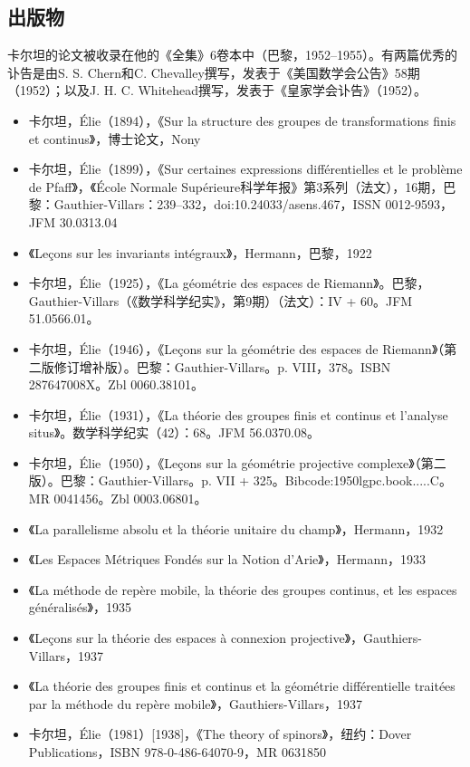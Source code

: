 \subsection{出版物}  
卡尔坦的论文被收录在他的《全集》6卷本中（巴黎，1952–1955）。有两篇优秀的讣告是由S. S. Chern和C. Chevalley撰写，发表于《美国数学会公告》58期（1952）；以及J. H. C. Whitehead撰写，发表于《皇家学会讣告》（1952）。
\begin{itemize}
\item 卡尔坦，Élie（1894），《Sur la structure des groupes de transformations finis et continus》，博士论文，Nony  
\item 卡尔坦，Élie（1899），《Sur certaines expressions différentielles et le problème de Pfaff》，《École Normale Supérieure科学年报》第3系列（法文），16期，巴黎：Gauthier-Villars：239–332，doi:10.24033/asens.467，ISSN 0012-9593，JFM 30.0313.04  
\item 《Leçons sur les invariants intégraux》，Hermann，巴黎，1922  
\item 卡尔坦，Élie（1925），《La géométrie des espaces de Riemann》。巴黎，Gauthier-Villars（《数学科学纪实》，第9期）（法文）：IV + 60。JFM 51.0566.01。  
\item 卡尔坦，Élie（1946），《Leçons sur la géométrie des espaces de Riemann》（第二版修订增补版）。巴黎：Gauthier-Villars。p. VIII，378。ISBN 287647008X。Zbl 0060.38101。  
\item 卡尔坦，Élie（1931），《La théorie des groupes finis et continus et l'analyse situs》。数学科学纪实（42）：68。JFM 56.0370.08。  
\item 卡尔坦，Élie（1950），《Leçons sur la géométrie projective complexe》（第二版）。巴黎：Gauthier-Villars。p. VII + 325。Bibcode:1950lgpc.book.....C。MR 0041456。Zbl 0003.06801。  
\item 《La parallelisme absolu et la théorie unitaire du champ》，Hermann，1932  
\item 《Les Espaces Métriques Fondés sur la Notion d'Arie》，Hermann，1933  
\item 《La méthode de repère mobile, la théorie des groupes continus, et les espaces généralisés》，1935  
\item 《Leçons sur la théorie des espaces à connexion projective》，Gauthiers-Villars，1937  
\item 《La théorie des groupes finis et continus et la géométrie différentielle traitées par la méthode du repère mobile》，Gauthiers-Villars，1937  
\item 卡尔坦，Élie（1981）[1938]，《The theory of spinors》，纽约：Dover Publications，ISBN 978-0-486-64070-9，MR 0631850  

\end{itemize}
